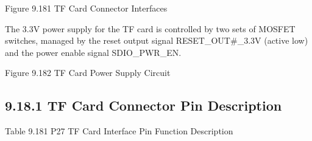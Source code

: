 \documentclass[letterpaper,10pt,openany,english]{sphinxmanual}
\begin{document}
\sphinxAtStartPar
{}

\sphinxAtStartPar
Figure 9.18\sphinxhyphen{}1 TF Card Connector Interfaces

\sphinxAtStartPar
The 3.3V power supply for the TF card is controlled by two sets of MOSFET switches, managed by the reset output signal RESET\_OUT\#\_3.3V (active low) and the power enable signal SDIO\_PWR\_EN.

\sphinxAtStartPar
{}

\sphinxAtStartPar
Figure 9.18\sphinxhyphen{}2 TF Card Power Supply Circuit


\subsection{9.18.1 TF Card Connector Pin Description}
\label{\detokenize{hardware:tf-card-connector-pin-description}}
\sphinxAtStartPar
Table 9.18\sphinxhyphen{}1 P27 TF Card Interface Pin Function Description
\end{document}
